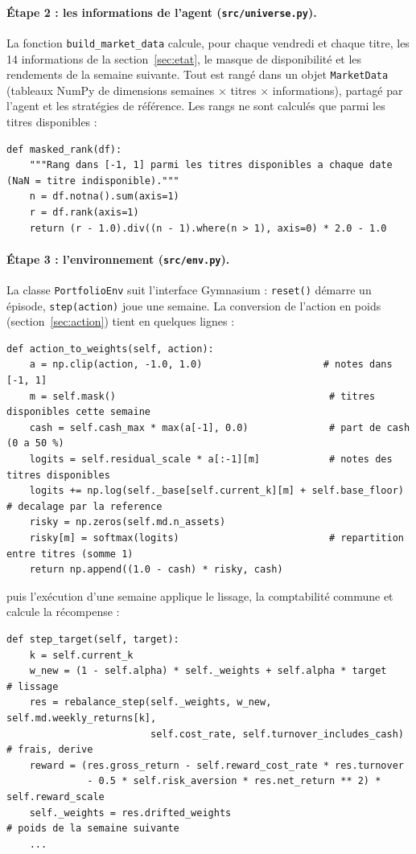 \documentclass[11pt,a4paper]{article}
\begin{document}
\paragraph{Étape 2 : les informations de l'agent (\texttt{src/universe.py}).} La fonction \texttt{build\_market\_data}
calcule, pour chaque vendredi et chaque titre, les 14 informations de la section~\ref{sec:etat}, le masque de disponibilité
et les rendements de la semaine suivante. Tout est rangé dans un objet \texttt{MarketData} (tableaux NumPy de
dimensions semaines \(\times\) titres \(\times\) informations), partagé par l'agent et les stratégies de référence.
Les rangs ne sont calculés que parmi les titres disponibles :

\begin{lstlisting}
def masked_rank(df):
    """Rang dans [-1, 1] parmi les titres disponibles a chaque date (NaN = titre indisponible)."""
    n = df.notna().sum(axis=1)
    r = df.rank(axis=1)
    return (r - 1.0).div((n - 1).where(n > 1), axis=0) * 2.0 - 1.0
\end{lstlisting}

\paragraph{Étape 3 : l'environnement (\texttt{src/env.py}).} La classe \texttt{PortfolioEnv} suit l'interface
Gymnasium : \texttt{reset()} démarre un épisode, \texttt{step(action)} joue une semaine. La conversion de l'action en
poids (section~\ref{sec:action}) tient en quelques lignes :

\begin{lstlisting}
def action_to_weights(self, action):
    a = np.clip(action, -1.0, 1.0)                     # notes dans [-1, 1]
    m = self.mask()                                     # titres disponibles cette semaine
    cash = self.cash_max * max(a[-1], 0.0)              # part de cash (0 a 50 %)
    logits = self.residual_scale * a[:-1][m]            # notes des titres disponibles
    logits += np.log(self._base[self.current_k][m] + self.base_floor)   # decalage par la reference
    risky = np.zeros(self.md.n_assets)
    risky[m] = softmax(logits)                          # repartition entre titres (somme 1)
    return np.append((1.0 - cash) * risky, cash)
\end{lstlisting}

\noindent puis l'exécution d'une semaine applique le lissage, la comptabilité commune et calcule la récompense :

\begin{lstlisting}
def step_target(self, target):
    k = self.current_k
    w_new = (1 - self.alpha) * self._weights + self.alpha * target      # lissage
    res = rebalance_step(self._weights, w_new, self.md.weekly_returns[k],
                         self.cost_rate, self.turnover_includes_cash)   # frais, derive
    reward = (res.gross_return - self.reward_cost_rate * res.turnover
              - 0.5 * self.risk_aversion * res.net_return ** 2) * self.reward_scale
    self._weights = res.drifted_weights                                 # poids de la semaine suivante
    ...
\end{lstlisting}
\end{document}
